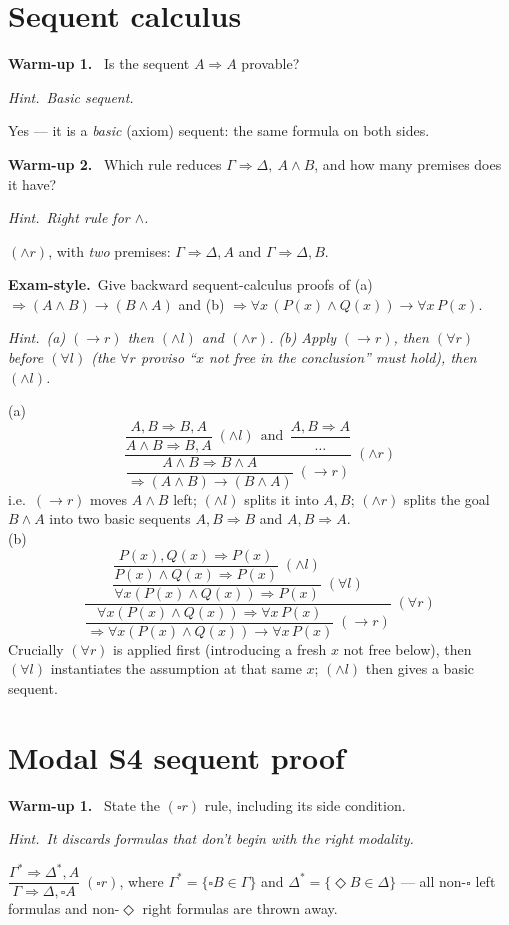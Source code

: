 \documentclass[11pt,a4paper]{article}
\newcommand{\hint}[1]{\par{\small\textcolor{accent}{\textit{Hint.}}\ \textit{#1}}\par\smallskip}
\newcommand{\warm}[1]{\smallskip\textbf{\textcolor{hi}{Warm-up #1.}}\ }
\newcommand{\exam}{\smallskip\textbf{\textcolor{warn}{Exam-style.}}\ }
\newcommand{\seq}{\Rightarrow}
\newcommand{\imp}{\rightarrow}
\newcommand{\rn}[1]{\;({#1})}
\begin{document}
\section{Sequent calculus}

\warm{1} Is the sequent $A\seq A$ provable?
\hint{Basic sequent.}
\begin{sol}Yes --- it is a \emph{basic} (axiom) sequent: the same formula on both sides.\end{sol}

\warm{2} Which rule reduces $\Gamma\seq\Delta,\ A\wedge B$, and how many premises does it have?
\hint{Right rule for $\wedge$.}
\begin{sol}$(\wedge r)$, with \emph{two} premises: $\Gamma\seq\Delta,A$ and $\Gamma\seq\Delta,B$.\end{sol}

\exam Give backward sequent-calculus proofs of (a) $\seq (A\wedge B)\imp(B\wedge A)$ and (b) $\seq \forall x\,(P(x)\wedge Q(x))\imp\forall x\,P(x)$.
\hint{(a) $(\imp r)$ then $(\wedge l)$ and $(\wedge r)$. (b) Apply $(\imp r)$, then $(\forall r)$ \emph{before} $(\forall l)$ (the $\forall r$ proviso ``$x$ not free in the conclusion'' must hold), then $(\wedge l)$.}
\begin{sol}
(a)
\[
\frac{\dfrac{A,B\seq B,A}{A\wedge B\seq B,A}\rn{\wedge l}\ \ \text{and}\ \ \dfrac{A,B\seq A}{\dots}}
{\dfrac{A\wedge B\seq B\wedge A}{\seq(A\wedge B)\imp(B\wedge A)}\rn{\imp r}}\rn{\wedge r}
\]
i.e.\ $(\imp r)$ moves $A\wedge B$ left; $(\wedge l)$ splits it into $A,B$; $(\wedge r)$ splits the goal $B\wedge A$ into two basic sequents $A,B\seq B$ and $A,B\seq A$.\\[3pt]
(b)
\[
\frac{\dfrac{\dfrac{P(x),Q(x)\seq P(x)}{P(x)\wedge Q(x)\seq P(x)}\rn{\wedge l}}{\forall x(P(x)\wedge Q(x))\seq P(x)}\rn{\forall l}}
{\dfrac{\forall x(P(x)\wedge Q(x))\seq\forall x\,P(x)}{\seq\forall x(P(x)\wedge Q(x))\imp\forall x\,P(x)}\rn{\imp r}}\rn{\forall r}
\]
Crucially $(\forall r)$ is applied first (introducing a fresh $x$ not free below), then $(\forall l)$ instantiates the assumption at that same $x$; $(\wedge l)$ then gives a basic sequent.
\end{sol}

\section{Modal S4 sequent proof}

\warm{1} State the $(\square r)$ rule, including its side condition.
\hint{It discards formulas that don't begin with the right modality.}
\begin{sol}
$\dfrac{\Gamma^{*}\seq\Delta^{*},A}{\Gamma\seq\Delta,\square A}\rn{\square r}$, where $\Gamma^{*}=\{\square B\in\Gamma\}$ and $\Delta^{*}=\{\Diamond B\in\Delta\}$ --- all non-$\square$ left formulas and non-$\Diamond$ right formulas are thrown away.
\end{sol}
\end{document}
